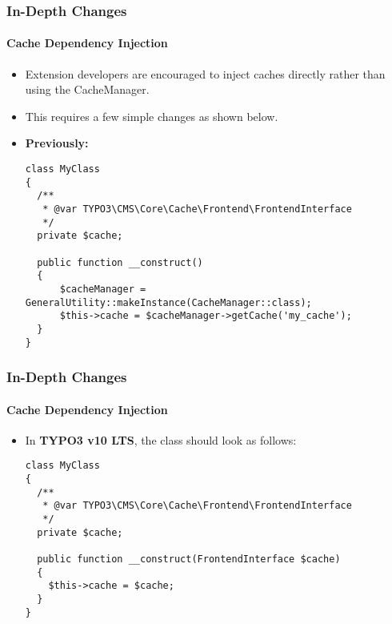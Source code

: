 
\begin{frame}[fragile]
	\frametitle{In-Depth Changes}
	\framesubtitle{Cache Dependency Injection}

	\lstset{basicstyle=\tiny\ttfamily}

	\begin{itemize}
		\item Extension developers are encouraged to inject caches directly rather than using the CacheManager.
		\item This requires a few simple changes as shown below.

		\item \textbf{Previously:}
\begin{lstlisting}
class MyClass
{
  /**
   * @var TYPO3\CMS\Core\Cache\Frontend\FrontendInterface
   */
  private $cache;

  public function __construct()
  {
      $cacheManager = GeneralUtility::makeInstance(CacheManager::class);
      $this->cache = $cacheManager->getCache('my_cache');
  }
}
\end{lstlisting}

	\end{itemize}

\end{frame}


\begin{frame}[fragile]
	\frametitle{In-Depth Changes}
	\framesubtitle{Cache Dependency Injection}

	\lstset{basicstyle=\tiny\ttfamily}

	\begin{itemize}
		\item In \textbf{TYPO3 v10 LTS}, the class should look as follows:
\begin{lstlisting}
class MyClass
{
  /**
   * @var TYPO3\CMS\Core\Cache\Frontend\FrontendInterface
   */
  private $cache;

  public function __construct(FrontendInterface $cache)
  {
    $this->cache = $cache;
  }
}
\end{lstlisting}

	\end{itemize}

\end{frame}


